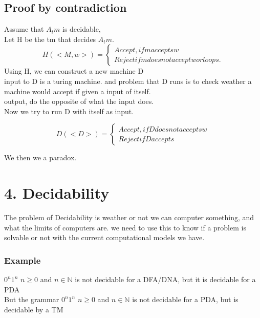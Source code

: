 \documentclass[a4paper,10pt,titlepage]{report}
\begin{document}
\subsection{Proof by contradiction}

Assume that $A_tm$ is decidable, \\
Let H be the tm that decides $A_tm$.\\

\[
H(<M,w>) = \left\{
                \begin{array}{ll}
                Accept, if m accepts w\\
                Reject if m does not accept w or loops.
\end{array}
\right.
  \]
Using H, we can construct a new machine D\\

input to D is a turing machine. and problem that D runs is to check weather a machine would accept if given a input of itself.\\

output, do the opposite of what the input does.\\

Now we try to run D with itself as input.

\[
D(<D>) = \left\{
                \begin{array}{ll}
                Accept, if D does not accepts w\\
                Reject if D accepts
\end{array}
\right.
  \]
  
We then we a paradox.\\



\newpage
\section{4. Decidability}
The problem of Decidability is weather or not we can computer something, and what the limits of computers are. we need to use this to know if a problem is solvable or not with the current computational models we have.

\subsubsection{Example}
$0^n1^n $   $ n \geq 0 $ and $n \in \mathbb{N}$ is not decidable for a DFA/DNA, but it is decidable for a PDA\\
But the grammar $0^n1^n $   $ n \geq 0 $ and $n \in \mathbb{N}$ is not decidable for a PDA, but is decidable by a TM
\end{document}
